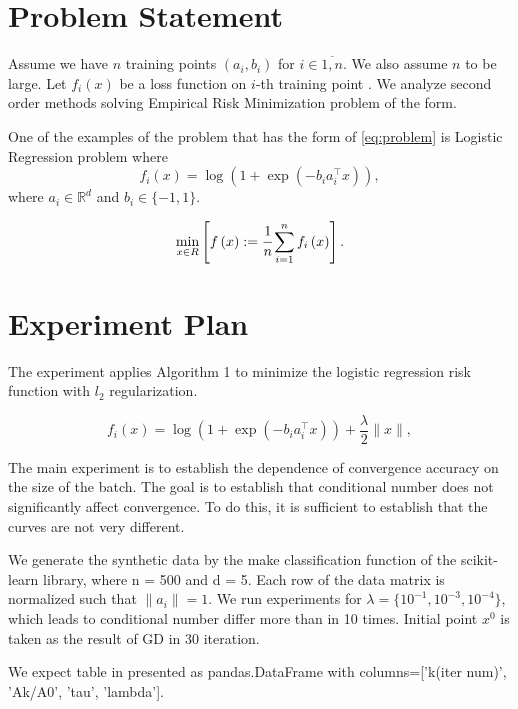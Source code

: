 \documentclass{article}
\begin{document}
\section{Problem Statement}

Assume we have $n$ training points $\left(a_i, b_i\right)$ for $i \in \overline{1, n}$. We also assume $n$ to be large. Let $f_i\left(x\right)$ be a loss function on $i$-th training point . We analyze second order methods solving Empirical Risk Minimization problem of the form.

One of the examples of the problem that has the form of \eqref{eq:problem} is Logistic Regression problem where
\begin{equation}
    f_i(x) = \log\left(1+\exp(-b_i a_i^\top x )\right),
\end{equation}
where $a_i \in \mathbb{R}^d$ and $b_i \in \{-1,1\}.$


\begin{equation}
    \min\limits_{x\in R} \left[f\left(x\right):=\cfrac{1}{n}\sum\limits_{i=1}^{n}f_i\left(x\right)\right].
\end{equation}

\section{Experiment Plan}

The experiment applies Algorithm 1 to minimize the logistic regression risk function with $l_2$ regularization.

\begin{equation}
    f_i(x) = \log\left(1+\exp(-b_i a_i^\top x )\right) + \frac{\lambda}{2}\|x\|,
\end{equation}

The main experiment is to establish the dependence of convergence accuracy on the size of the batch. The goal is to establish that conditional number does not significantly affect convergence. To do this, it is sufficient to establish that the curves are not very different. 

We generate the synthetic data by the make classification function of the scikit-learn library, where n = 500 and d = 5. Each row of the data matrix is normalized such that $\|a_i\| = 1$. We run experiments for $\lambda = \{10^{-1}, 10^{-3}, 10^{-4}\}$, which leads to conditional number differ more than in 10 times.
Initial point $x^0$ is taken as the result of GD in 30 iteration.

\newpage

We expect table in presented as pandas.DataFrame with columns=['k(iter num)', 'Ak/A0', 'tau', 'lambda'].
\end{document}
